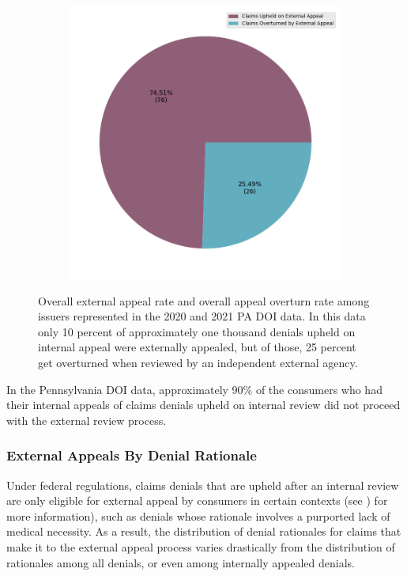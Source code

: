 \documentclass[12pt, a4paper,twoside]{report}
\theoremstyle{plain} %
\theoremstyle{definition} %
\theoremstyle{remark} %
\numberwithin{equation}{chapter}
\begin{document}
\begin{figure}[h!]
\begin{subfigure}[b]{0.49\textwidth}
				\includegraphics[width=\textwidth]{images/pa_claims/external_appeal_success_rates.png}
			\end{subfigure}
			\caption{Overall external appeal rate and overall appeal overturn rate among issuers represented in the 2020 and 2021 PA DOI data. In this data only 10 percent of approximately one thousand denials upheld on internal appeal were externally appealed, but of those, 25 percent get overturned when reviewed by an independent external agency.}
			\label{paexternalappealpie}
		\end{figure}
		
		In the Pennsylvania DOI data, approximately 90\% of the consumers who had their internal appeals of claims denials upheld on internal review did not proceed with the external review process.
		
		
		\subsubsection{External Appeals By Denial Rationale}
		
		Under federal regulations, claims denials that are upheld after an internal review are only eligible for external appeal by consumers in certain contexts (see \cite{pollitz2021}) for more information), such as denials whose rationale involves a purported lack of medical necessity. As a result, the distribution of denial rationales for claims that make it to the external appeal process varies drastically from the distribution of rationales among all denials, or even among internally appealed denials.
		
\end{document}
